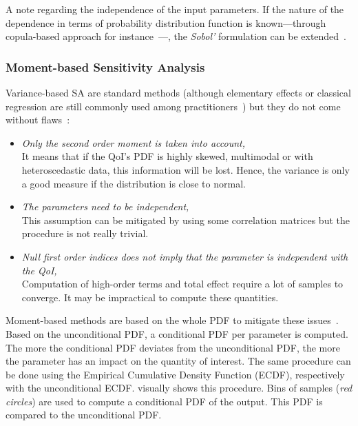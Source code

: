 A note regarding the independence of the input parameters. If the nature of the dependence in terms of probability distribution function is known---through copula-based approach for instance~\cite{caniou2012}---, the \emph{Sobol'} formulation can be extended~\cite{Kucherenko2012,Kucherenko2017,Iooss2017}.

\subsubsection{Moment-based Sensitivity Analysis}
Variance-based SA are standard methods (although elementary effects or classical regression are still commonly used among practitioners~\cite{ferretti2016}) but they do not come without flaws~\cite{borgonovo2016}:

\begin{itemize}
\item \emph{Only the second order moment is taken into account,}\\
It means that if the QoI's PDF is highly skewed, multimodal or with heteroscedastic data, this information will be lost. Hence, the variance is only a good measure if the distribution is close to normal.
\item \emph{The parameters need to be independent,}\\
This assumption can be mitigated by using some correlation matrices but the procedure is not really trivial.
\item \emph{Null first order indices does not imply that the parameter is independent with the QoI,}\\
Computation of high-order terms and total effect require a lot of samples to converge. It may be impractical to compute these quantities.
\end{itemize}

Moment-based methods are based on the whole PDF to mitigate these issues~\cite{borgonovo2007}. Based on the unconditional PDF, a conditional PDF per parameter is computed. The more the conditional PDF deviates from the unconditional PDF, the more the parameter has an impact on the quantity of interest. The same procedure can be done using the Empirical Cumulative Density Function (ECDF), respectively with the unconditional ECDF.  visually shows this procedure. Bins of samples (\emph{red circles}) are used to compute a conditional PDF of the output. This PDF is compared to the unconditional PDF.

